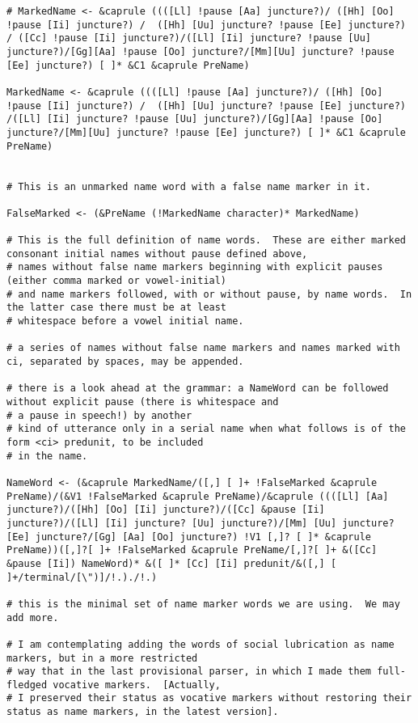 \documentclass{article}
\begin{document}
\begin{verbatim}
# MarkedName <- &caprule ((([Ll] !pause [Aa] juncture?)/ ([Hh] [Oo] !pause [Ii] juncture?) /  ([Hh] [Uu] juncture? !pause [Ee] juncture?) / ([Cc] !pause [Ii] juncture?)/([Ll] [Ii] juncture? !pause [Uu] juncture?)/[Gg][Aa] !pause [Oo] juncture?/[Mm][Uu] juncture? !pause [Ee] juncture?) [ ]* &C1 &caprule PreName)

MarkedName <- &caprule ((([Ll] !pause [Aa] juncture?)/ ([Hh] [Oo] !pause [Ii] juncture?) /  ([Hh] [Uu] juncture? !pause [Ee] juncture?) /([Ll] [Ii] juncture? !pause [Uu] juncture?)/[Gg][Aa] !pause [Oo] juncture?/[Mm][Uu] juncture? !pause [Ee] juncture?) [ ]* &C1 &caprule PreName)


# This is an unmarked name word with a false name marker in it.

FalseMarked <- (&PreName (!MarkedName character)* MarkedName)

# This is the full definition of name words.  These are either marked consonant initial names without pause defined above,
# names without false name markers beginning with explicit pauses (either comma marked or vowel-initial) 
# and name markers followed, with or without pause, by name words.  In the latter case there must be at least
# whitespace before a vowel initial name.

# a series of names without false name markers and names marked with ci, separated by spaces, may be appended.

# there is a look ahead at the grammar: a NameWord can be followed without explicit pause (there is whitespace and 
# a pause in speech!) by another
# kind of utterance only in a serial name when what follows is of the form <ci> predunit, to be included
# in the name.

NameWord <- (&caprule MarkedName/([,] [ ]+ !FalseMarked &caprule PreName)/(&V1 !FalseMarked &caprule PreName)/&caprule ((([Ll] [Aa] juncture?)/([Hh] [Oo] [Ii] juncture?)/([Cc] &pause [Ii] juncture?)/([Ll] [Ii] juncture? [Uu] juncture?)/[Mm] [Uu] juncture? [Ee] juncture?/[Gg] [Aa] [Oo] juncture?) !V1 [,]? [ ]* &caprule PreName))([,]?[ ]+ !FalseMarked &caprule PreName/[,]?[ ]+ &([Cc] &pause [Ii]) NameWord)* &([ ]* [Cc] [Ii] predunit/&([,] [ ]+/terminal/[\")]/!.)./!.)

# this is the minimal set of name marker words we are using.  We may add more.

# I am contemplating adding the words of social lubrication as name markers, but in a more restricted
# way that in the last provisional parser, in which I made them full-fledged vocative markers.  [Actually,
# I preserved their status as vocative markers without restoring their status as name markers, in the latest version].


\end{verbatim}
\end{document}
